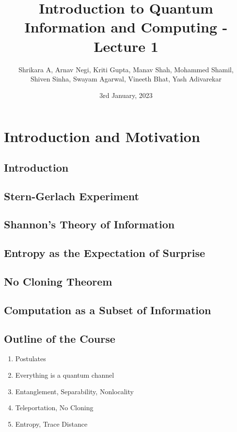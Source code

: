 \documentclass{article}
\title{Introduction to Quantum Information and Computing - Lecture 1}
\author{Shrikara A, Arnav Negi, Kriti Gupta, Manav Shah, Mohammed Shamil,\\ Shiven Sinha, Swayam Agarwal, Vineeth Bhat, Yash Adivarekar} %
\date{3rd January, 2023}
\begin{document}
    \maketitle
    \vfill
    \tableofcontents
    \newpage


    \section{Introduction and Motivation}
        \subsection{Introduction}

        \subsection{Stern-Gerlach Experiment}

        \subsection{Shannon's Theory of Information}

        \subsection{Entropy as the Expectation of Surprise}

        \subsection{No Cloning Theorem}

        \subsection{Computation as a Subset of Information}

    \subsection{Outline of the Course}
        \begin{enumerate}
            \item Postulates
            \item Everything is a quantum channel
            \item Entanglement, Separability, Nonlocality
            \item Teleportation, No Cloning
            \item Entropy, Trace Distance
        \end{enumerate}
\end{document}
